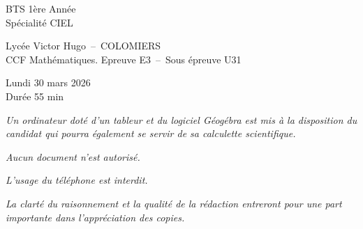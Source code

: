 \thispagestyle{empty}
    \begin{minipage}{0.2\linewidth}
    \begin{tcolorbox}[colback=white, title=, width=1\linewidth]	
        BTS 1ère Année \\
        Spécialité CIEL 
    \end{tcolorbox}
\end{minipage}\hfill
\begin{minipage}{0.54\linewidth}
    \begin{tcolorbox}[colback=white, title=, width=1\linewidth]	
        \begin{center}
            Lycée Victor Hugo~--~COLOMIERS \\
            CCF Mathématiques. Epreuve E3~--~Sous épreuve U31 
        \end{center}
        
    \end{tcolorbox}
\end{minipage}\hfill
\begin{minipage}{0.25\linewidth}
    \begin{tcolorbox}[colback=white, title=, width=1\linewidth]	
        \begin{center}
            Lundi 30 mars 2026 \\
    Durée 55 min
        \end{center}
        
    \end{tcolorbox}
\end{minipage}\hfill

\vspace{2cm}

\NomPrenom{}

\vspace{2cm}

\begin{center}
    
\emph{Un ordinateur doté d'un tableur et du logiciel Géogébra est mis à la disposition du candidat qui pourra également se servir de sa calculette scientifique.}

\bigskip

\emph{Aucun document n'est autorisé.}

\bigskip

\emph{L'usage du téléphone est interdit.}

\bigskip

\emph{La clarté du raisonnement et la qualité de la rédaction entreront pour une part importante dans l'appréciation des copies.}

\end{center}

